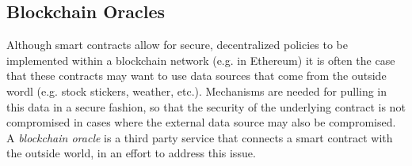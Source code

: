 \documentclass[10pt,a4paper]{article}
\begin{document}



\subsection{Blockchain Oracles}

Although smart contracts allow for secure, decentralized policies to be implemented within a blockchain network (e.g. in Ethereum) it is often the case that these contracts may want to use data sources that come from the outside wordl (e.g. stock stickers, weather, etc.). Mechanisms are needed for pulling in this data in a secure fashion, so that the security of the underlying contract is not compromised in cases where the external data source may also be compromised. A \textit{blockchain oracle} \cite{2016towncrier,breidenbach2021chainlink} is a third party service that connects a smart contract with the outside world, in an effort to address this issue.





\end{document}
